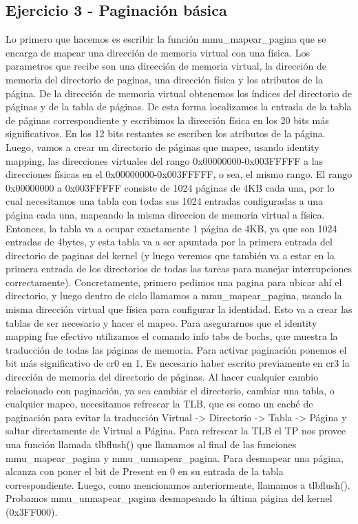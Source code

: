 \documentclass[10pt,a4paper,spanish]{article}
\begin{document}
\subsection{Ejercicio 3 - Paginación básica}
Lo primero que hacemos es escribir la función mmu_mapear_pagina que se encarga de mapear una dirección de memoria virtual con una física. Los parametros que recibe son una dirección de memoria virtual, la dirección de memoria del directorio de paginas, una dirección física y los atributos de la página.
De la dirección de memoria virtual obtenemos los índices del directorio de páginas y de la tabla de páginas. De esta forma localizamos la entrada de la tabla de páginas correspondiente y escribimos la dirección física en los 20 bits más significativos. En los 12 bits restantes se escriben los atributos de la página.
Luego, vamos a crear un directorio de páginas que mapee, usando identity mapping, las direcciones virtuales del rango 0x00000000-0x003FFFFF a las direcciones físicas en el 0x00000000-0x003FFFFF, o sea, el mismo rango.
El rango 0x00000000 a 0x003FFFFF consiste de 1024 páginas de 4KB cada una, por lo cual necesitamos una tabla con todas sus 1024 entradas configuradas a una página cada una, mapeando la misma direccion de memoria virtual a física. Entonces, la tabla va a ocupar exactamente 1 página de 4KB, ya que son 1024 entradas de 4bytes, y esta tabla va a ser apuntada por la primera entrada del directorio de paginas del kernel (y luego veremos que también va a estar en la primera entrada de los directorios de todas las tareas para manejar interrupciones correctamente).
Concretamente, primero pedimos una pagina para ubicar ahí el directorio, y luego dentro de ciclo llamamos a mmu_mapear_pagina, usando la misma dirección virtual que física para configurar la identidad. Esto va a crear las tablas de ser necesario y hacer el mapeo.
Para asegurarnos que el identity mapping fue efectivo utilizamos el comando info tabs de bochs, que muestra la traducción de todas las páginas de memoria.
Para activar paginación ponemos el bit más significativo de cr0 en 1. Es necesario haber escrito previamente en cr3 la dirección de memoria del directorio de páginas.
Al hacer cualquier cambio relacionado con paginación, ya sea cambiar el directorio, cambiar una tabla, o cualquier mapeo, necesitamos refrescar la TLB, que es como un caché de paginación para evitar la traducción Virtual -> Directorio -> Tabla -> Página y saltar directamente de Virtual a Página. Para refrescar la TLB el TP nos provee una función llamada tlbflush() que llamamos al final de las funciones mmu_mapear_pagina y mmu_unmapear_pagina.
Para desmapear una página, alcanza con poner el bit de Present en 0 en su entrada de la tabla correspondiente. Luego, como mencionamos anteriormente, llamamos a tlbflush().
Probamos mmu_unmapear_pagina desmapeando la última página del kernel (0x3FF000).
\end{document}
